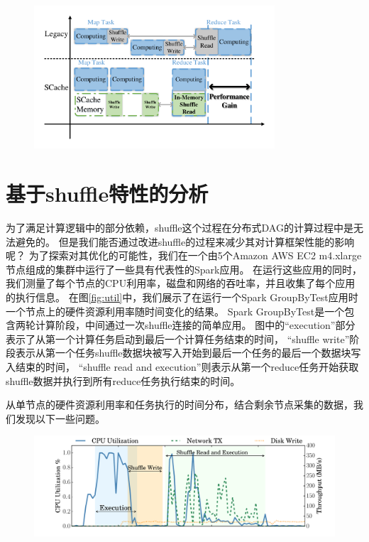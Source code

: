 \begin{figure}[!htp]
	\centering
	\includegraphics[width=0.8\textwidth]{../../PPoPP-2018/fig/workflow.pdf}
\end{figure}

\section{基于shuffle特性的分析}

为了满足计算逻辑中的部分依赖，shuffle这个过程在分布式DAG的计算过程中是无法避免的。
但是我们能否通过改进shuffle的过程来减少其对计算框架性能的影响呢？
为了探索对其优化的可能性，我们在一个由5个Amazon AWS EC2 m4.xlarge\cite{aws}节点组成的集群中运行了一些具有代表性的Spark应用。
在运行这些应用的同时，我们测量了每个节点的CPU利用率，磁盘和网络的吞吐率，并且收集了每个应用的执行信息。
在图\ref{fig:util}中，我们展示了在运行一个Spark GroupByTest应用时一个节点上的硬件资源利用率随时间变化的结果。
Spark GroupByTest是一个包含两轮计算阶段，中间通过一次shuffle连接的简单应用。
图中的“execution”部分表示了从第一个计算任务启动到最后一个计算任务结束的时间，
“shuffle write”阶段表示从第一个任务shuffle数据块被写入开始到最后一个任务的最后一个数据块写入结束的时间，
“shuffle read and execution”则表示从第一个reduce任务开始获取shuffle数据并执行到所有reduce任务执行结束的时间。

从单节点的硬件资源利用率和任务执行的时间分布，结合剩余节点采集的数据，我们发现以下一些问题。

\begin{figure}[!htp]
	\centering
	\includegraphics[width=\textwidth]{../../PPoPP-2018/fig/util.pdf}
\end{figure}


